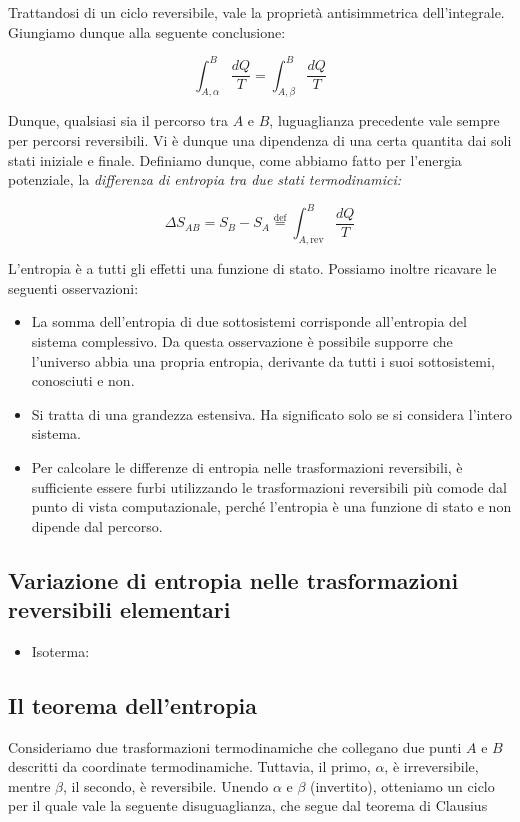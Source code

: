 \noindent Trattandosi di un ciclo reversibile, vale la proprietà
antisimmetrica dell'integrale. Giungiamo dunque alla seguente conclusione:

\[ \int_{A,\alpha}^{B} \frac{dQ}{T} = \int_{A,\beta}^{B} \frac{dQ}{T} \]

\noindent Dunque, qualsiasi sia il percorso tra $A$ e $B$, luguaglianza
precedente vale sempre per percorsi reversibili. Vi è dunque una dipendenza
di una certa quantita dai soli stati iniziale e finale. Definiamo dunque,
come abbiamo fatto per l'energia potenziale, la \textit{differenza di
entropia tra due stati termodinamici:}

\[ \Delta S_{AB} = S_B - S_A \stackrel{\text{def}}{=} \int_{A,\text{rev}}^{B} \frac{dQ}{T} \]

\noindent L'entropia è a tutti gli effetti una funzione di stato. Possiamo
inoltre ricavare le seguenti osservazioni:

\begin{itemize}
    \item La somma dell'entropia di due sottosistemi corrisponde all'entropia
    del sistema complessivo. Da questa osservazione è possibile supporre
    che l'universo abbia una propria entropia, derivante da tutti i suoi
    sottosistemi, conosciuti e non.

    \item Si tratta di una grandezza estensiva. Ha significato solo se si
    considera l'intero sistema.

    \item Per calcolare le differenze di entropia nelle trasformazioni
    reversibili, è sufficiente essere furbi utilizzando le trasformazioni
    reversibili più comode dal punto di vista computazionale, perché
    l'entropia è una funzione di stato e non dipende dal percorso.
\end{itemize}

\subsection*{Variazione di entropia nelle trasformazioni reversibili elementari}
\begin{itemize}
    \item Isoterma:
\end{itemize}


\subsection*{Il teorema dell'entropia}
Consideriamo due trasformazioni termodinamiche che collegano due punti
$A$ e $B$ descritti da coordinate termodinamiche. Tuttavia, il primo,
$\alpha$, è irreversibile, mentre $\beta$, il secondo, è reversibile.
Unendo $\alpha$ e $\beta$ (invertito), otteniamo un ciclo per il quale
vale la seguente disuguaglianza, che segue dal teorema di Clausius


